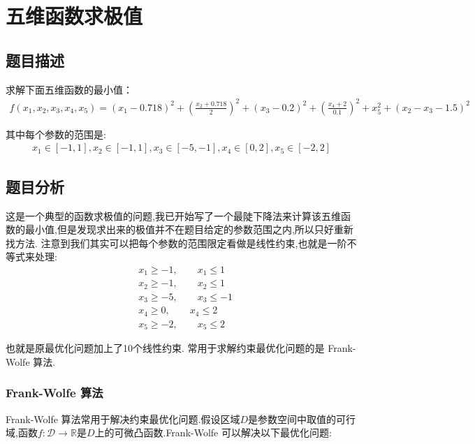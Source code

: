 \chapter{五维函数求极值}
\section{题目描述}

求解下面五维函数的最小值：
\begin{align}
f \left( x _ { 1 } , x _ { 2 } , x _ { 3 } , x _ { 4 } , x _ { 5 } \right) = \left( x _ { 1 } - 0.718 \right) ^ { 2 } + \left( \frac { x _ { 2 } + 0.718 } { 2 } \right) ^ { 2 } + \left( x _ { 3 } - 0.2 \right) ^ { 2 } + \left( \frac { x _ { 4 } + 2 } { 0.1 } \right) ^ { 2 } + x _ { 5 } ^ { 2 } + \left( x _ { 2 } - x _ { 3 } - 1.5 \right) ^ { 2 }
\end{align}

其中每个参数的范围是:
\begin{align}
x _ { 1 } \in [ - 1,1 ] , x _ { 2 } \in [ - 1,1 ] , x _ { 3 } \in [ - 5 , - 1 ] , x _ { 4 } \in [ 0,2 ] , x _ { 5 } \in [ - 2,2 ]
\end{align}

\section{题目分析}

这是一个典型的函数求极值的问题,我已开始写了一个最陡下降法来计算该五维函数的最小值,但是发现求出来的极值并不在题目给定的参数范围之内,所以只好重新找方法. 注意到我们其实可以把每个参数的范围限定看做是线性约束,也就是一阶不等式来处理:
\begin{align}
&x_1\geq -1, \qquad x_1\leq 1\\
&x_2\geq -1, \qquad x_2\leq 1\\
&x_3\geq -5, \qquad x_3\leq -1\\
&x_4\geq 0, \qquad x_4\leq 2\\
&x_5\geq -2, \qquad x_5\leq 2
\end{align}

也就是原最优化问题加上了10个线性约束. 常用于求解约束最优化问题的是 Frank-Wolfe 算法.

\subsection{Frank-Wolfe 算法}

Frank-Wolfe 算法常用于解决约束最优化问题.假设区域$D$是参数空间中取值的可行域,函数$f\colon {\mathcal  {D}}\to {\mathbb  {R}} $是$D$上的可微凸函数.Frank-Wolfe 可以解决以下最优化问题:

